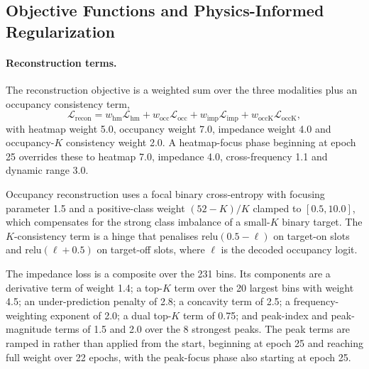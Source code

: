 
\subsection{Objective Functions and Physics-Informed Regularization}
\label{subsec:objective_physics_reg}

\paragraph{Reconstruction terms.} The reconstruction objective is a weighted sum over the three
modalities plus an occupancy consistency term,
\begin{equation}
\mathcal{L}_{\mathrm{recon}}
= w_{\mathrm{hm}} \mathcal{L}_{\mathrm{hm}}
+ w_{\mathrm{occ}} \mathcal{L}_{\mathrm{occ}}
+ w_{\mathrm{imp}} \mathcal{L}_{\mathrm{imp}}
+ w_{\mathrm{occK}} \mathcal{L}_{\mathrm{occK}} ,
\label{eq:recon}
\end{equation}
with heatmap weight 5.0, occupancy weight 7.0, impedance weight 4.0 and occupancy-$K$ consistency
weight 2.0. A heatmap-focus phase beginning at epoch 25 overrides these to heatmap 7.0, impedance
4.0, cross-frequency 1.1 and dynamic range 3.0.

Occupancy reconstruction uses a focal binary cross-entropy with focusing parameter 1.5 and a
positive-class weight $(52-K)/K$ clamped to $[0.5, 10.0]$, which compensates for the strong class
imbalance of a small-$K$ binary target. The $K$-consistency term is a hinge that penalises
$\mathrm{relu}(0.5 - \ell)$ on target-on slots and $\mathrm{relu}(\ell + 0.5)$ on target-off slots,
where $\ell$ is the decoded occupancy logit.

The impedance loss is a composite over the 231 bins. Its components are a derivative term of weight
1.4; a top-$K$ term over the 20 largest bins with weight 4.5; an under-prediction penalty of 2.8; a
concavity term of 2.5; a frequency-weighting exponent of 2.0; a dual top-$K$ term of 0.75; and
peak-index and peak-magnitude terms of 1.5 and 2.0 over the 8 strongest peaks. The peak terms are
ramped in rather than applied from the start, beginning at epoch 25 and reaching full weight over 22
epochs, with the peak-focus phase also starting at epoch 25.

